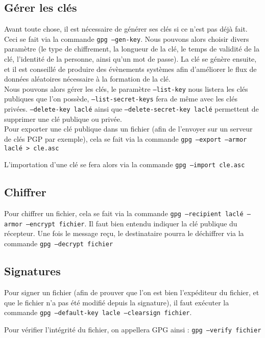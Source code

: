 \subsection{Gérer les clés}
Avant toute chose, il est nécessaire de générer ses clés si ce
n'est pas déjà fait. Ceci se fait via la commande \texttt{gpg
--gen-key}. Nous pouvons alors choisir divers paramètre (le type
de chiffrement, la longueur de la clé, le temps de validité de la
clé, l'identité de la personne, ainsi qu'un mot de passe).
La clé se génère ensuite, et il est conseillé de produire des
évènements systèmes afin d'améliorer le flux de données
aléatoires nécessaire à la formation de la clé.
\\

Nous pouvons alors gérer les clés, le paramètre
\texttt{--list-key} nous listera les clés publiques que l'on
possède, \texttt{--list-secret-keys} fera de même avec les clés
privées. \texttt{--delete-key laclé} ainsi que
\texttt{--delete-secret-key laclé} permettent de supprimer une clé
publique ou privée.
\\

Pour exporter une clé publique dans un fichier (afin de l'envoyer sur un
serveur de clés PGP par exemple), cela se fait via la commande
\texttt{gpg --export --armor laclé > cle.asc} 

L'importation d'une clé se fera alors via la commande \texttt{gpg
--import cle.asc}
\subsection{Chiffrer}
Pour chiffrer un fichier, cela se fait via la commande \texttt{gpg
--recipient laclé --armor --encrypt fichier}. Il faut bien entendu
indiquer la clé publique du récepteur.
Une fois le message reçu, le destinataire pourra le déchiffrer via
la commande \texttt{gpg --decrypt fichier}
\subsection{Signatures}
Pour signer un fichier (afin de prouver que l'on est bien
l'expéditeur du fichier, et que le fichier n'a pas été modifié
depuis la signature), il faut exécuter la commande \texttt{gpg
--default-key lacle --clearsign fichier}.

Pour vérifier l'intégrité du fichier, on appellera GPG ainsi :
\texttt{gpg --verify fichier}
